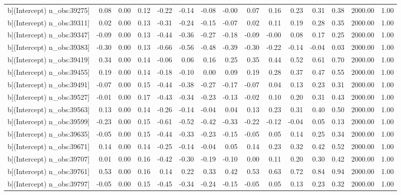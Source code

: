 \begin{table}[ht]
\begin{tabular}{rrrrrrrrrrrrrrr}
  b[(Intercept) n\_obs:39275] & 0.08 & 0.00 & 0.12 & -0.22 & -0.14 & -0.08 & -0.00 & 0.07 & 0.16 & 0.23 & 0.31 & 0.38 & 2000.00 & 1.00 \\ 
  b[(Intercept) n\_obs:39311] & 0.02 & 0.00 & 0.13 & -0.31 & -0.24 & -0.15 & -0.07 & 0.02 & 0.11 & 0.19 & 0.28 & 0.35 & 2000.00 & 1.00 \\ 
  b[(Intercept) n\_obs:39347] & -0.09 & 0.00 & 0.13 & -0.44 & -0.36 & -0.27 & -0.18 & -0.09 & -0.00 & 0.08 & 0.17 & 0.25 & 2000.00 & 1.00 \\ 
  b[(Intercept) n\_obs:39383] & -0.30 & 0.00 & 0.13 & -0.66 & -0.56 & -0.48 & -0.39 & -0.30 & -0.22 & -0.14 & -0.04 & 0.03 & 2000.00 & 1.00 \\ 
  b[(Intercept) n\_obs:39419] & 0.34 & 0.00 & 0.14 & -0.06 & 0.06 & 0.16 & 0.25 & 0.35 & 0.44 & 0.52 & 0.61 & 0.70 & 2000.00 & 1.00 \\ 
  b[(Intercept) n\_obs:39455] & 0.19 & 0.00 & 0.14 & -0.18 & -0.10 & 0.00 & 0.09 & 0.19 & 0.28 & 0.37 & 0.47 & 0.55 & 2000.00 & 1.00 \\ 
  b[(Intercept) n\_obs:39491] & -0.07 & 0.00 & 0.15 & -0.44 & -0.38 & -0.27 & -0.17 & -0.07 & 0.04 & 0.13 & 0.23 & 0.31 & 2000.00 & 1.00 \\ 
  b[(Intercept) n\_obs:39527] & -0.01 & 0.00 & 0.17 & -0.43 & -0.34 & -0.23 & -0.13 & -0.02 & 0.10 & 0.20 & 0.31 & 0.43 & 2000.00 & 1.00 \\ 
  b[(Intercept) n\_obs:39563] & 0.13 & 0.00 & 0.14 & -0.26 & -0.14 & -0.04 & 0.04 & 0.13 & 0.23 & 0.31 & 0.40 & 0.50 & 2000.00 & 1.00 \\ 
  b[(Intercept) n\_obs:39599] & -0.23 & 0.00 & 0.15 & -0.61 & -0.52 & -0.42 & -0.33 & -0.22 & -0.12 & -0.04 & 0.05 & 0.13 & 2000.00 & 1.00 \\ 
  b[(Intercept) n\_obs:39635] & -0.05 & 0.00 & 0.15 & -0.44 & -0.33 & -0.23 & -0.15 & -0.05 & 0.05 & 0.14 & 0.25 & 0.34 & 2000.00 & 1.00 \\ 
  b[(Intercept) n\_obs:39671] & 0.14 & 0.00 & 0.14 & -0.25 & -0.14 & -0.04 & 0.05 & 0.14 & 0.23 & 0.32 & 0.42 & 0.52 & 2000.00 & 1.00 \\ 
  b[(Intercept) n\_obs:39707] & 0.01 & 0.00 & 0.16 & -0.42 & -0.30 & -0.19 & -0.10 & 0.00 & 0.11 & 0.20 & 0.30 & 0.42 & 2000.00 & 1.00 \\ 
  b[(Intercept) n\_obs:39761] & 0.53 & 0.00 & 0.16 & 0.14 & 0.22 & 0.33 & 0.42 & 0.53 & 0.63 & 0.72 & 0.84 & 0.94 & 2000.00 & 1.00 \\ 
  b[(Intercept) n\_obs:39797] & -0.05 & 0.00 & 0.15 & -0.45 & -0.34 & -0.24 & -0.15 & -0.05 & 0.05 & 0.13 & 0.23 & 0.32 & 2000.00 & 1.00 \\ 

\end{tabular}
\end{table}
